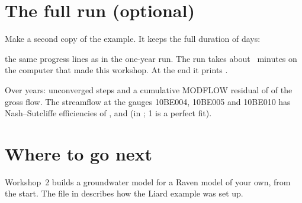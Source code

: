 \section{The full run (optional)}

\label{st:full}
Make a second copy of the example. It keeps the full duration of  days:
\see the same progress lines as in the one-year run. The run takes about ~minutes on the computer that made
this workshop. At the end it prints .

\begin{tocheck}
Over  years:  unconverged steps and a cumulative MODFLOW residual of  of
the gross flow. The streamflow at the gauges 10BE004, 10BE005 and 10BE010 has Nash--Sutcliffe efficiencies of
,  and  (in ; 1 is a perfect fit).
\end{tocheck}

\section{Where to go next}
Workshop~2 builds a groundwater model for a Raven model of your own, from the start. The file  in
 describes how the Liard example was set up.
